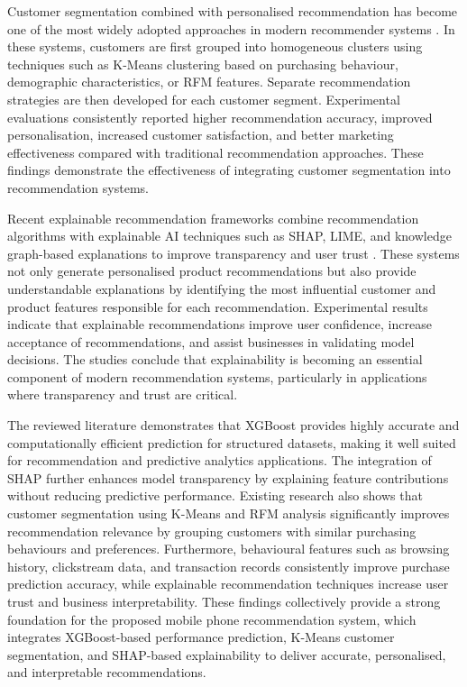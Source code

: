 \documentclass[12pt]{report}
\numberwithin{figure}{chapter}
\numberwithin{table}{chapter}
\numberwithin{equation}{chapter}
\begin{document}
Customer segmentation combined with personalised recommendation has become one of the most widely adopted approaches in modern recommender systems \cite{segmentrecommend}. In these systems, customers are first grouped into homogeneous clusters using techniques such as K-Means clustering based on purchasing behaviour, demographic characteristics, or RFM features. Separate recommendation strategies are then developed for each customer segment. Experimental evaluations consistently reported higher recommendation accuracy, improved personalisation, increased customer satisfaction, and better marketing effectiveness compared with traditional recommendation approaches. These findings demonstrate the effectiveness of integrating customer segmentation into recommendation systems.

Recent explainable recommendation frameworks combine recommendation algorithms with explainable AI techniques such as SHAP, LIME, and knowledge graph-based explanations to improve transparency and user trust \cite{xairecommend}. These systems not only generate personalised product recommendations but also provide understandable explanations by identifying the most influential customer and product features responsible for each recommendation. Experimental results indicate that explainable recommendations improve user confidence, increase acceptance of recommendations, and assist businesses in validating model decisions. The studies conclude that explainability is becoming an essential component of modern recommendation systems, particularly in applications where transparency and trust are critical.

The reviewed literature demonstrates that XGBoost provides highly accurate and computationally efficient prediction for structured datasets, making it well suited for recommendation and predictive analytics applications. The integration of SHAP further enhances model transparency by explaining feature contributions without reducing predictive performance. Existing research also shows that customer segmentation using K-Means and RFM analysis significantly improves recommendation relevance by grouping customers with similar purchasing behaviours and preferences. Furthermore, behavioural features such as browsing history, clickstream data, and transaction records consistently improve purchase prediction accuracy, while explainable recommendation techniques increase user trust and business interpretability. These findings collectively provide a strong foundation for the proposed mobile phone recommendation system, which integrates XGBoost-based performance prediction, K-Means customer segmentation, and SHAP-based explainability to deliver accurate, personalised, and interpretable recommendations.
\end{document}
